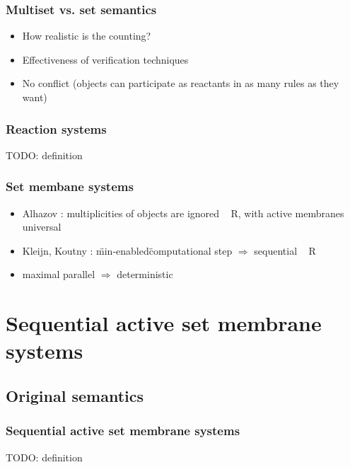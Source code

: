     \begin{frame}[t]\frametitle{Multiset vs. set semantics}
      \begin{itemize}
        \item How realistic is the counting?
        \item Effectiveness of verification techniques
        \item No conflict (objects can participate as reactants in as many rules as they want)
      \end{itemize}
      
    \end{frame}
    \note{}

    \begin{frame}[t]\frametitle{Reaction systems}
      TODO: definition
    \end{frame}
    \note{}

    \begin{frame}[t]\frametitle{Set membane systems}
      \begin{itemize}
        \item Alhazov \cite{Alhazov05WithoutMultiplicities}: multiplicities of objects are ignored ~ R, with active membranes universal
        \item Kleijn, Koutny \cite{Kleijn11SetMembrane}: \"min-enabled\" computational step $\Rightarrow$ sequential ~ R
        \item maximal parallel $\Rightarrow$ deterministic
      \end{itemize}
    \end{frame}
    \note{}



\section{Sequential active set membrane systems} %
\label{sec:sequential_active_set_membrane_systems}

  \subsection{Original semantics} %
  \label{sub:original_semantics}

    \begin{frame}[t]\frametitle{Sequential active set membrane systems}
      TODO: definition
    \end{frame}
    \note{}


